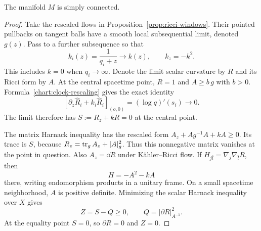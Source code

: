 \begin{proposition}\label{prop:simple-connectivity}
The manifold $M$ is simply connected.
\end{proposition}

\begin{proof}
Take the rescaled flows in Proposition~\ref{prop:ricci-windows}.
Their pointed pullbacks on tangent balls have a smooth local
subsequential limit, denoted $g(z)$.  Pass to a further subsequence
so that
\[
 k_i(z)=\frac1{q_i+z}\longrightarrow k(z),\qquad k_z=-k^2.
\]
This includes $k=0$ when $q_i\to\infty$.  Denote the limit
scalar curvature by $R$ and its Ricci form by $A$.  At the
central spacetime point, $R=1$ and $A\ge b\,g$ with $b>0$.
Formula~\eqref{chart:clock-rescaling} gives the exact identity
\[
 \left[\partial_z\widehat R_i+k_i\widehat R_i\right]_{(o,0)}
       =(\log q)'(s_i)\longrightarrow0.
\]
The limit therefore has $S:=R_z+kR=0$ at the central point.

The matrix Harnack inequality has the rescaled form
$A_z+A g^{-1}A+kA\ge0$.  Its trace is $S$, because
$R_z=\operatorname{tr}_g A_z+|A|_g^2$.  Thus this nonnegative matrix vanishes
at the point in question.  Also $A_z=\dd R$ under K\"ahler--Ricci
flow.  If $H_{j\bar l}=\nabla_j\nabla_{\bar l}R$, then
\begin{equation}\label{chart:equality-mixed-hessian}
 H=-A^2-kA
\end{equation}
there, writing endomorphism products in a unitary frame.
On a small spacetime neighborhood, $A$ is positive definite.
Minimizing the scalar Harnack inequality over $X$ gives
\begin{equation}\label{chart:equality-Z}
 Z=S-Q\ge0,\qquad Q=|\partial R|_{A^{-1}}^2.
\end{equation}
At the equality point $S=0$, so $\partial R=0$ and $Z=0$.


\end{proof}

